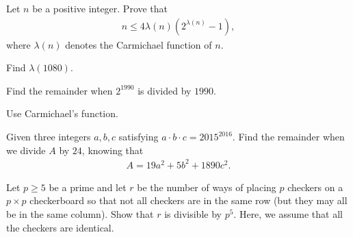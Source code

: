 \documentclass{subfile}
\begin{document}
	
	\begin{problem} %
		Let $n$ be a positive integer. Prove that
		\begin{align*}
		n\le 4\lambda(n)\left(2^{\lambda(n)}-1\right),
		\end{align*}
		where $\lambda(n)$ denotes the Carmichael function of $n$.
	\end{problem}
	
	\begin{problem}
		Find $\lambda(1080)$.
	\end{problem}

	\begin{problem}[RMO 1990]%
		Find the remainder when $2^{1990}$ is divided by $1990$.
	\end{problem}

	\begin{hint}
		Use Carmichael's function.
	\end{hint}

	\begin{problem} %
		Given three integers $a,b,c$ satisfying $a\cdot b\cdot c=2015^{2016}$. Find the remainder when we divide $A$ by $24$, knowing that
		\begin{align*}
		A=19a^2+5b^2+1890c^2.
		\end{align*}
	\end{problem}
	
	\begin{problem}[APMO 2006] %
		Let $p\ge5$ be a prime and let $r$ be the number of ways of placing $p$ checkers on a $p\times p$ checkerboard so that not all checkers are in the same row (but they may all be in the same column). Show that $r$ is divisible by $p^5$. Here, we assume that all the checkers are identical.
	\end{problem}
	
\end{document}
